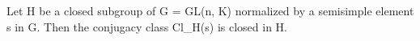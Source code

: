 Let H be a closed subgroup of G = GL(n, K) normalized by a semisimple element s in G. Then the conjugacy class Cl_H(s) is closed in H.
